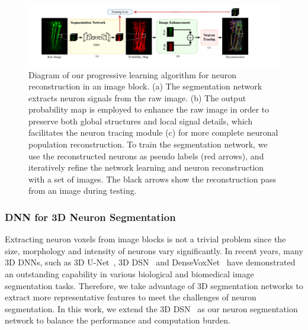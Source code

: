 \begin{figure}[th]
	\centering
	\includegraphics[width=1\textwidth]{./Illustrations/framework2.pdf}
	\caption{Diagram of our progressive learning algorithm for neuron reconstruction in an image block. (a) The segmentation network extracts neuron signals from the raw image. (b) The output probability map is employed to enhance the raw image in order to preserve both global structures and local signal details, which facilitates the neuron tracing module (c) for more complete neuronal population reconstruction. To train the segmentation network, we use the reconstructed neurons as pseudo labels (red arrows), and iteratively refine the network learning and neuron reconstruction with a set of images. The black arrows show the reconstruction pass from an image during testing.}
	\label{fig:framework}
\end{figure}





\subsubsection{DNN for 3D Neuron Segmentation}
\label{sec:network}
 
Extracting neuron voxels from image blocks is not a trivial problem since the size, morphology and intensity of neurons vary significantly.
In recent years, many 3D DNNs, such as 3D U-Net~\cite{Cicek2016}, 3D DSN~\cite{Dou2017} and DenseVoxNet~\cite{Yu2017} have demonstrated an outstanding capability in various biological and biomedical image segmentation tasks.
Therefore, we take advantage of 3D segmentation networks to extract more representative features to meet the challenges of neuron segmentation.
In this work, we extend the 3D DSN~\cite{Dou2017} as our neuron segmentation network to balance the performance and computation burden.


